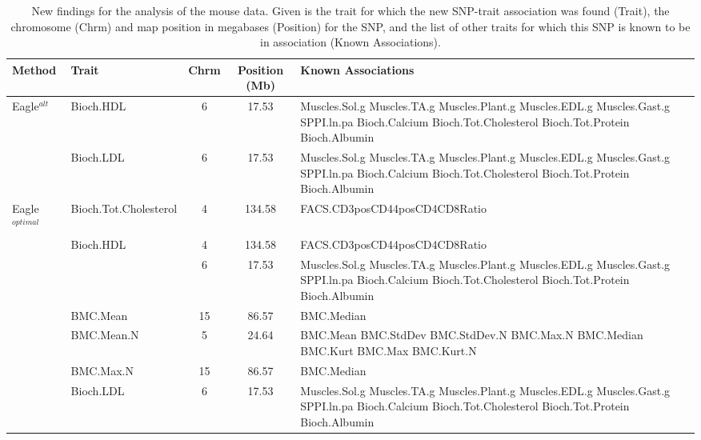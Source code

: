 \documentclass{article}
\begin{document}
\begin{table}[h]
\scriptsize
\caption{New findings for the analysis of the mouse data. Given is the trait for which the new SNP-trait association was found (Trait), 
the chromosome (Chrm) and map position in megabases (Position) for the SNP, and the list of other traits for which this SNP is known to be 
in association (Known Associations). }
\label{suptabnew}
\vspace{0.5cm}
\begin{tabular}{llccp{6cm}} \hline
Method           &  Trait  & Chrm  &  Position (Mb)  & Known Associations \\  \hline  
Eagle$^{alt}$  & Bioch.HDL   & 6   & 17.53         & Muscles.Sol.g Muscles.TA.g Muscles.Plant.g Muscles.EDL.g  Muscles.Gast.g 
     SPPI.ln.pa Bioch.Calcium    Bioch.Tot.Cholesterol Bioch.Tot.Protein Bioch.Albumin \\ 
                       & Bioch.LDL   & 6    &  17.53        & Muscles.Sol.g Muscles.TA.g Muscles.Plant.g Muscles.EDL.g  Muscles.Gast.g SPPI.ln.pa Bioch.Calcium  Bioch.Tot.Cholesterol Bioch.Tot.Protein Bioch.Albumin \\  [0.45cm]
 Eagle$^{optimal}$  &        Bioch.Tot.Cholesterol  & 4      &  134.58  & FACS.CD3posCD44posCD4CD8Ratio  \\
                        & Bioch.HDL                  & 4      &  134.58  & FACS.CD3posCD44posCD4CD8Ratio   \\
                        &                                    & 6      &    17.53   & Muscles.Sol.g Muscles.TA.g Muscles.Plant.g Muscles.EDL.g  Muscles.Gast.g 
     SPPI.ln.pa Bioch.Calcium    Bioch.Tot.Cholesterol Bioch.Tot.Protein Bioch.Albumin  \\
                        & BMC.Mean                 & 15    &     86.57  & BMC.Median \\
                        & BMC.Mean.N             &  5     &     24.64   &  BMC.Mean BMC.StdDev BMC.StdDev.N  BMC.Max.N  BMC.Median BMC.Kurt
                        BMC.Max BMC.Kurt.N  \\
                        & BMC.Max.N               & 15    &      86.57  & BMC.Median \\
                        & Bioch.LDL                  & 6      &   17.53   & Muscles.Sol.g Muscles.TA.g Muscles.Plant.g Muscles.EDL.g  Muscles.Gast.g 
     SPPI.ln.pa Bioch.Calcium    Bioch.Tot.Cholesterol Bioch.Tot.Protein Bioch.Albumin  \\  \hline
                                           
                       
                    

\end{tabular}
\end{table}
\end{document}
